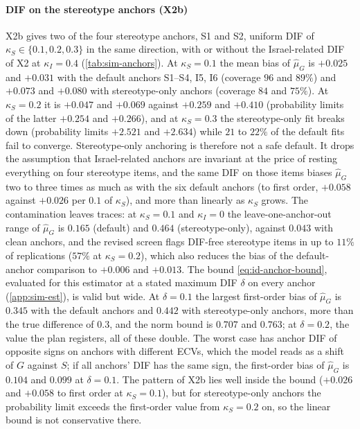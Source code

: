 \paragraph{DIF on the stereotype anchors (X2b)}
X2b gives two of the four stereotype anchors, S1 and S2, uniform DIF of $\kappa_S\in\{0.1,0.2,0.3\}$ in the same direction, with or without the Israel-related DIF of X2 at $\kappa_I=0.4$ (\cref{tab:sim-anchors}). At $\kappa_S=0.1$ the mean bias of $\hat\mu_G$ is $+0.025$ and $+0.031$ with the default anchors S1--S4, I5, I6 (coverage $96$ and $89\%$) and $+0.073$ and $+0.080$ with stereotype-only anchors (coverage $84$ and $75\%$). At $\kappa_S=0.2$ it is $+0.047$ and $+0.069$ against $+0.259$ and $+0.410$ (probability limits of the latter $+0.254$ and $+0.266$), and at $\kappa_S=0.3$ the stereotype-only fit breaks down (probability limits $+2.521$ and $+2.634$) while $21$ to $22\%$ of the default fits fail to converge. Stereotype-only anchoring is therefore not a safe default. It drops the assumption that Israel-related anchors are invariant at the price of resting everything on four stereotype items, and the same DIF on those items biases $\hat\mu_G$ two to three times as much as with the six default anchors (to first order, $+0.058$ against $+0.026$ per $0.1$ of $\kappa_S$), and more than linearly as $\kappa_S$ grows. The contamination leaves traces: at $\kappa_S=0.1$ and $\kappa_I=0$ the leave-one-anchor-out range of $\hat\mu_G$ is $0.165$ (default) and $0.464$ (stereotype-only), against $0.043$ with clean anchors, and the revised screen flags DIF-free stereotype items in up to $11\%$ of replications ($57\%$ at $\kappa_S=0.2$), which also reduces the bias of the default-anchor comparison to $+0.006$ and $+0.013$. The bound \eqref{eq:id-anchor-bound}, evaluated for this estimator at a stated maximum DIF $\delta$ on every anchor (\cref{app:sim-est}), is valid but wide. At $\delta=0.1$ the largest first-order bias of $\hat\mu_G$ is $0.345$ with the default anchors and $0.442$ with stereotype-only anchors, more than the true difference of $0.3$, and the norm bound is $0.707$ and $0.763$; at $\delta=0.2$, the value the plan registers, all of these double. The worst case has anchor DIF of opposite signs on anchors with different ECVs, which the model reads as a shift of $G$ against $S$; if all anchors' DIF has the same sign, the first-order bias of $\hat\mu_G$ is $0.104$ and $0.099$ at $\delta=0.1$. The pattern of X2b lies well inside the bound ($+0.026$ and $+0.058$ to first order at $\kappa_S=0.1$), but for stereotype-only anchors the probability limit exceeds the first-order value from $\kappa_S=0.2$ on, so the linear bound is not conservative there.

